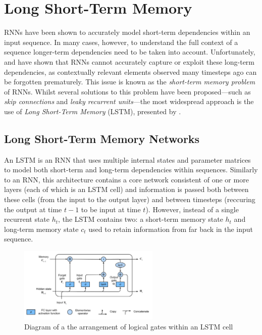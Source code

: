 \documentclass[a4paper, 11pt]{report}
\begin{document}
    \section{Long Short-Term Memory}

    RNNs have been shown to accurately model short-term dependencies within an input sequence. In many cases, however, to understand the full context of a sequence longer-term dependencies need to be taken into account. Unfortunately, \citet{hochreiter-1991} and \citet{bengio-1994} have shown that RNNs cannot accurately capture or exploit these long-term dependencies, as contextually relevant elements observed many timesteps ago can be forgotten prematurely. This issue is known as the \emph{short-term memory problem} of RNNs. Whilst several solutions to this problem have been proposed---such as \emph{skip connections} and \emph{leaky recurrent units}---the most widespread approach is the use of \emph{Long Short-Term Memory} (LSTM), presented by \citet{hochreiter-1997}.


    \subsection{Long Short-Term Memory Networks}

    An LSTM is an RNN that uses multiple internal states and parameter matrices to model both short-term and long-term dependencies within sequences. Similarly to an RNN, this architecture contains a core network consistent of one or more layers (each of which is an LSTM cell) and information is passed both between these cells (from the input to the output layer) and between timesteps (reccuring the output at time $t-1$ to be input at time $t$). However, instead of a single recurrent state $h_t$, the LSTM contains two: a short-term memory state $h_t$ and long-term memory state $c_t$ used to retain information from far back in the input sequence.

    \begin{figure}[ht]
        \centering
        \includegraphics[width=0.6\textwidth]{lstm.png}
        \caption{\centering Diagram of a the arrangement of logical gates within an LSTM cell \citep{zhang-2021}}
        \label{fig: lstm}
    \end{figure}
\end{document}
